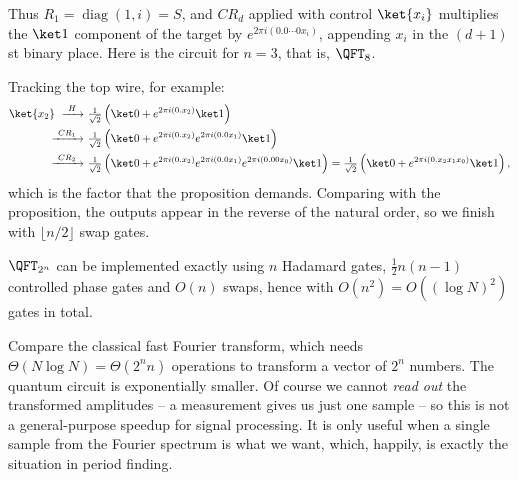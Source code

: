 Thus $R_1 = \operatorname{diag}(1,i) = S$, and $CR_d$ applied with control $\ket{x_i}$ multiplies the $\ket1$ component of the target by $e^{2\pi i(0.0\cdots0x_i)}$, appending $x_i$ in the $(d+1)$st binary place. Here is the circuit for $n = 3$, that is, $\QFT_8$.

\begin{center}
\end{center}

Tracking the top wire, for example:
\begin{align*}
	\ket{x_2}\ \xrightarrow{\ H\ }&\ \tfrac1{\sqrt2}\left(\ket0+e^{2\pi i(0.x_2)}\ket1\right)\\
	\xrightarrow{\ CR_1\ }&\ \tfrac1{\sqrt2}\left(\ket0+e^{2\pi i(0.x_2)}e^{2\pi i(0.0x_1)}\ket1\right)\\
	\xrightarrow{\ CR_2\ }&\ \tfrac1{\sqrt2}\left(\ket0+e^{2\pi i(0.x_2)}e^{2\pi i(0.0x_1)}e^{2\pi i(0.00x_0)}\ket1\right) = \tfrac1{\sqrt2}\left(\ket0+e^{2\pi i(0.x_2x_1x_0)}\ket1\right),
\end{align*}
which is the factor that the proposition demands. Comparing with the proposition, the outputs appear in the reverse of the natural order, so we finish with $\lfloor n/2\rfloor$ swap gates.

\begin{proposition}
	$\QFT_{2^n}$ can be implemented exactly using $n$ Hadamard gates, $\tfrac12n(n-1)$ controlled phase gates and $O(n)$ swaps, hence with $O(n^2) = O((\log N)^2)$ gates in total.
\end{proposition}

Compare the classical fast Fourier transform, which needs $\Theta(N\log N) = \Theta(2^n n)$ operations to transform a vector of $2^n$ numbers. The quantum circuit is exponentially smaller. Of course we cannot \emph{read out} the transformed amplitudes -- a measurement gives us just one sample -- so this is not a general-purpose speedup for signal processing. It is only useful when a single sample from the Fourier spectrum is what we want, which, happily, is exactly the situation in period finding.

